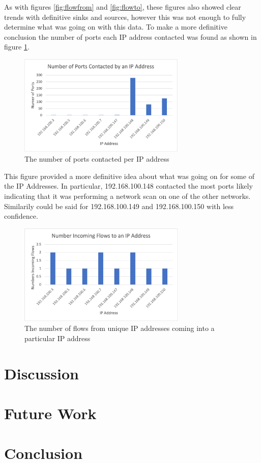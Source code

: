 \documentclass[conference]{IEEEtran}
\begin{document}
As with figures \ref{fig:flowfrom} and \ref{fig:flowto}, these figures also showed clear trends with definitive
sinks and sources, however this was not enough to fully determine what was going on with this data. To make a more
definitive conclusion the number of ports each IP address contacted was found as shown in figure \ref{fig:portscontacted}.

\begin{figure}[h]
    \includegraphics[width=8cm]{Figure5.png}
    \centering
    \caption{The number of ports contacted per IP address}
    \label{fig:portscontacted}
\end{figure}

This figure provided a more definitive idea about what was going on for some of the IP Addresses. In particular,
192.168.100.148 contacted the most ports likely indicating that it was performing a network scan on one of the
other networks. Similarily could be said for 192.168.100.149 and 192.168.100.150 with less confidence.

\begin{figure}[h]
    \includegraphics[width=8cm]{Figure6.png}
    \centering
    \caption{The number of flows from unique IP addresses coming into a particular IP address}
    \label{fig:incomingflows}
\end{figure}

\section{Discussion}

\section{Future Work}

\section{Conclusion}

\printbibliography
\end{document}
